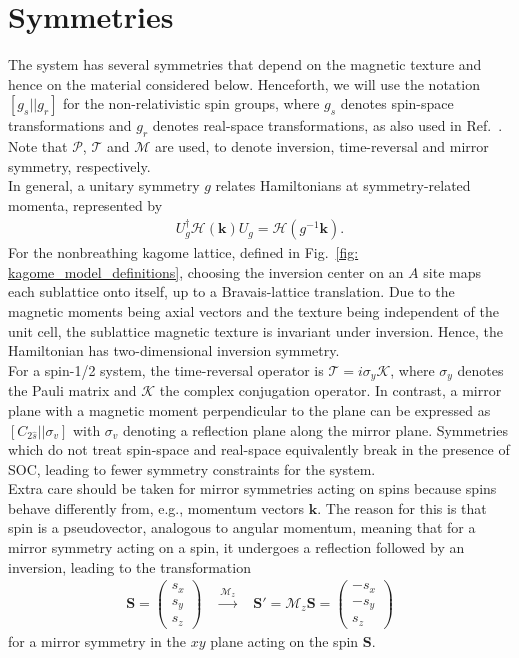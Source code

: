 \section{Symmetries}
\label{section: Symmetries}
The system has several symmetries that depend on the magnetic texture and hence on the material considered below. Henceforth, we will use the notation $[g_s||g_r]$ for the non-relativistic spin groups, where $g_s$ denotes spin-space transformations and $g_r$ denotes real-space transformations, as also used in Ref.~\cite{Quelle3}. Note that $\mathcal{P}$, $\mathcal{T}$ and $\mathcal{M}$ are used, to denote inversion, time-reversal and mirror symmetry, respectively. \\
In general, a unitary symmetry $g$ relates Hamiltonians at symmetry-related momenta, represented by
\begin{align}
    U_g^\dagger \mathcal{H}(\mathbf{k})U_g = \mathcal{H}(g^{-1}\mathbf{k}) .
    \label{eq: symmetry_unitary}
\end{align}
For the nonbreathing kagome lattice, defined in Fig.~\ref{fig: kagome_model_definitions}, choosing the inversion center on an $A$ site maps each sublattice onto itself, up to a Bravais-lattice translation. Due to the magnetic moments being axial vectors and the texture being independent of the unit cell, the sublattice magnetic texture is invariant under inversion. Hence, the Hamiltonian has two-dimensional inversion symmetry.\\
For a spin-1/2 system, the time-reversal operator is $\mathcal{T} = i \sigma_y \mathcal{K}$, where $\sigma_y$ denotes the Pauli matrix and $\mathcal{K}$ the complex conjugation operator.
In contrast, a mirror plane with a magnetic moment perpendicular to the plane can be expressed as $[C_{2\hat{s}}||\sigma_v]$ with $\sigma_v$ denoting a reflection plane along the mirror plane. 
Symmetries which do not treat spin-space and real-space equivalently break in the presence of SOC, leading to fewer symmetry constraints for the system. \\
Extra care should be taken for mirror symmetries acting on spins because spins behave differently from, e.g., momentum vectors $\mathbf{k}$.
The reason for this is that spin is a pseudovector, analogous to angular momentum, meaning that for a mirror symmetry acting on a spin, it undergoes a reflection followed by an inversion, leading to the transformation
\begin{align}
    \mathbf{S}=\begin{pmatrix}
        s_x\\s_y\\s_z
    \end{pmatrix} \quad\xrightarrow{\mathcal{M}_z}\quad \mathbf{S}'=\mathcal{M}_z \mathbf{S}= \begin{pmatrix}
        -s_x\\ -s_y \\ s_z
    \end{pmatrix} 
    \label{eq: mirror on spin}
\end{align}
for a mirror symmetry in the $xy$ plane acting on the spin $\mathbf{S}$.\\

